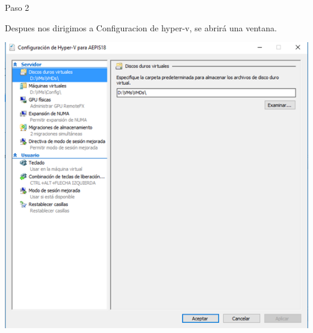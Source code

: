 	\begin{itemize}
	\begin{center}
	    Paso 2
	\end{center}
	

	    Despues nos dirigimos a Configuracion de hyper-v, se abrirá una ventana. 
		\begin{center}
		\includegraphics[width=15cm]{./Imagenes/imagen2} 
		\end{center}
	

	\end{itemize} 
  
  
  

